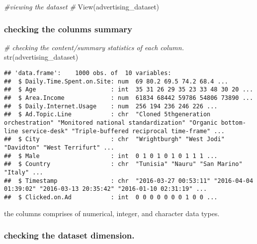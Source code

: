 \documentclass[
]{article}
\newenvironment{Shaded}{\begin{snugshade}}{\end{snugshade}}
\newcommand{\CommentTok}[1]{\textcolor[rgb]{0.56,0.35,0.01}{\textit{#1}}}
\newcommand{\FunctionTok}[1]{\textcolor[rgb]{0.00,0.00,0.00}{#1}}
\newcommand{\NormalTok}[1]{#1}
\begin{document}
\begin{Shaded}
\begin{Highlighting}[]
\CommentTok{\#viewing the dataset}
\CommentTok{\#}
\FunctionTok{View}\NormalTok{(advertising\_dataset)}
\end{Highlighting}
\end{Shaded}

\hypertarget{checking-the-colunms-summary}{%
\subsubsection{checking the colunms
summary}\label{checking-the-colunms-summary}}

\begin{Shaded}
\begin{Highlighting}[]
\CommentTok{\# checking the content/summary statistics of each column.}
\FunctionTok{str}\NormalTok{(advertising\_dataset)}
\end{Highlighting}
\end{Shaded}

\begin{verbatim}
## 'data.frame':    1000 obs. of  10 variables:
##  $ Daily.Time.Spent.on.Site: num  69 80.2 69.5 74.2 68.4 ...
##  $ Age                     : int  35 31 26 29 35 23 33 48 30 20 ...
##  $ Area.Income             : num  61834 68442 59786 54806 73890 ...
##  $ Daily.Internet.Usage    : num  256 194 236 246 226 ...
##  $ Ad.Topic.Line           : chr  "Cloned 5thgeneration orchestration" "Monitored national standardization" "Organic bottom-line service-desk" "Triple-buffered reciprocal time-frame" ...
##  $ City                    : chr  "Wrightburgh" "West Jodi" "Davidton" "West Terrifurt" ...
##  $ Male                    : int  0 1 0 1 0 1 0 1 1 1 ...
##  $ Country                 : chr  "Tunisia" "Nauru" "San Marino" "Italy" ...
##  $ Timestamp               : chr  "2016-03-27 00:53:11" "2016-04-04 01:39:02" "2016-03-13 20:35:42" "2016-01-10 02:31:19" ...
##  $ Clicked.on.Ad           : int  0 0 0 0 0 0 0 1 0 0 ...
\end{verbatim}

the columns comprises of numerical, integer, and character data types.

\hypertarget{checking-the-dataset-dimension.}{%
\subsubsection{checking the dataset
dimension.}\label{checking-the-dataset-dimension.}}
\end{document}
